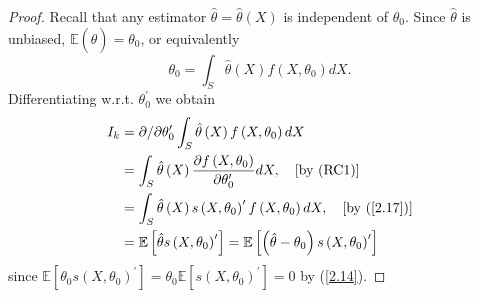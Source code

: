 \documentclass[notes=show]{beamer}
\begin{document}
\begin{frame}%

\begin{proof}
Recall that any estimator $\hat{\theta}=\hat{\theta}\left( X\right) $ is
independent of $\theta _{0}.$ Since $\hat{\theta}$ is unbiased, $\mathbb{E}%
\left( \hat{\theta}\right) =\theta _{0}$, or equivalently%
\begin{equation*}
\theta _{0}=\int_{S}\hat{\theta}\left( X\right) f\left( X,\theta _{0}\right)
dX.
\end{equation*}%
Differentiating w.r.t. $\theta _{0}^{\prime }$ we obtain%
\begin{align}
I_{k}& =\partial /\partial \theta _{0}^{\prime }\int_{S}\hat{\theta}\left(
X\right) f\left( X,\theta _{0}\right) dX  \notag \\
& =\int_{S}\hat{\theta}\left( X\right) \frac{\partial f\left( X,\theta
_{0}\right) }{\partial \theta _{0}^{\prime }}dX,\text{\quad \lbrack by (RC1)]%
}  \notag \\
& =\int_{S}\hat{\theta}\left( X\right) s\left( X,\theta _{0}\right) ^{\prime
}f\left( X,\theta _{0}\right) dX,\quad \text{[by (\ref{2.17})]}  \notag \\
& =\mathbb{E}\left[ \hat{\theta}s\left( X,\theta _{0}\right) ^{\prime }%
\right] =\mathbb{E}\left[ \left( \hat{\theta}-\theta _{0}\right) s\left(
X,\theta _{0}\right) ^{\prime }\right]  \label{2.21}
\end{align}%
since $\mathbb{E}\left[ \theta _{0}s\left( X,\theta _{0}\right) ^{\prime }%
\right] =\theta _{0}\mathbb{E}\left[ s\left( X,\theta _{0}\right) ^{\prime }%
\right] =0$ by (\ref{2.14}).
\end{proof}

\end{frame}%
\end{document}

